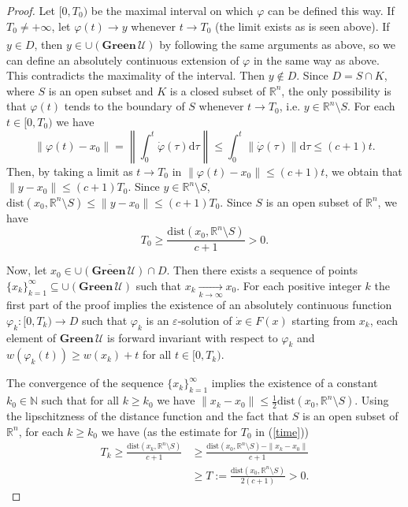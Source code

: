 \documentclass[a4paper]{article}
\begin{document}
\begin{proof}
    Let $[0,T_0)$ be the maximal interval on which $\varphi$ can be defined this way.
    If $T_0 \ne +\infty$, let $\varphi(t) \xrightarrow[]{} y$ whenever $t \to T_0$ (the limit exists as is seen above).
    If $y \in D$, then $y \in \cup(\mathbf{Green} \,\mathcal{U})$ by following the same arguments as above, so we can define an absolutely continuous extension of $\varphi$ in the same way as above. This contradicts the maximality of the interval.
    Then $y \notin D$. Since $D = S \cap K$, where $S$ is an open subset and $K$ is a closed subset of $\mathbb{R}^n$, the only possibility is that $\varphi(t)$ tends to the boundary of $S$ whenever $t \to T_0$, i.e. $y \in \mathbb{R}^n \setminus S$.
    For each $t \in [0,T_0)$ we have $$\left\|\varphi(t)-x_0\right\| = \left\|\int_{0}^{t} \dot{\varphi}(\tau)\mathrm{d}\tau\right\| \le \int_{0}^{t} \left\|\dot{\varphi}(\tau)\right\|\mathrm{d}\tau \le (c+1)t.$$
    Then, by taking a limit as $t \to T_0$ in $\left\|\varphi(t)-x_0\right\| \le (c+1)t$, we obtain that $\|y-x_0\| \le (c+1)T_0$. Since $y \in \mathbb{R}^n \setminus S$, $\mathrm{dist}\left(x_0,\mathbb{R}^n \setminus S\right) \le \|y-x_0\| \le (c+1)T_0$. Since $S$ is an open subset of $\mathbb{R}^n$, we have
    \begin{equation}\label{time}
        T_0 \ge \frac{\mathrm{dist}(x_0,\mathbb{R}^n \setminus S)}{c+1} > 0.
    \end{equation}

    Now, let $x_0 \in \overline{\cup(\mathbf{Green} \,\mathcal{U})} \cap D$. Then there exists a sequence of points $\{x_k\}_{k=1}^{\infty} \subseteq \cup(\mathbf{Green} \,\mathcal{U})$ such that $x_k \xrightarrow[k \to \infty]{} x_0$.
    For each positive integer $k$ the first part of the proof implies the existence of an absolutely continuous function $\varphi_k : [0,T_k) \to D$ such that $\varphi_k$ is an $\varepsilon$-solution of $\dot{x} \in F(x)$ starting from $x_k$, each element of $\mathbf{Green} \,\mathcal{U}$ is forward invariant with respect to $\varphi_k$ and $w(\varphi_k(t)) \ge w(x_k) + t$ for all $t \in [0,T_k)$.

    The convergence of the sequence $\{x_k\}_{k=1}^{\infty}$ implies the existence of a constant $k_0 \in \mathbb{N}$ such that for all $k \ge k_0$ we have $\|x_k-x_0\| \le \frac{1}{2} \mathrm{dist}(x_0,\mathbb{R}^n \setminus S)$. Using the lipschitzness of the distance function and the fact that $S$ is an open subset of $\mathbb{R}^n$, for each $k \ge k_0$ we have (as the estimate for $T_0$ in (\ref{time}))
    \begin{equation}\label{time2}
        \begin{aligned}
            T_k   {\ge} \frac{\mathrm{dist}(x_k,\mathbb{R}^n \setminus S)}{c+1} &\ge \frac{\mathrm{dist}(x_0,\mathbb{R}^n \setminus S) - \|x_k-x_0\|}{c+1}\\ &\ge T:= \frac{\mathrm{dist}(x_0,\mathbb{R}^n \setminus S)}{2(c+1)} > 0.
        \end{aligned}
    \end{equation}


\end{proof}
\end{document}
